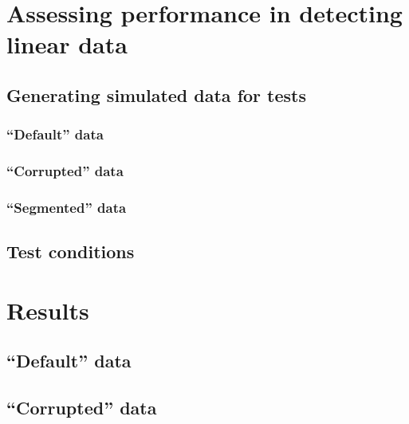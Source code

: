 \documentclass[
  oneside, 11pt, a4paper]{memoir}
\begin{document}
\hypertarget{assessing-performance-in-detecting-linear-data}{%
\section{Assessing performance in detecting linear data}\label{assessing-performance-in-detecting-linear-data}}

\hypertarget{generating-simulated-data-for-tests}{%
\subsection{Generating simulated data for tests}\label{generating-simulated-data-for-tests}}

\hypertarget{default-data}{%
\subsubsection{\texorpdfstring{\enquote{Default} data}{``Default'' data}}\label{default-data}}

\hypertarget{corrupted-data}{%
\subsubsection{\texorpdfstring{\enquote{Corrupted} data}{``Corrupted'' data}}\label{corrupted-data}}

\hypertarget{segmented-data}{%
\subsubsection{\texorpdfstring{\enquote{Segmented} data}{``Segmented'' data}}\label{segmented-data}}

\hypertarget{test-conditions}{%
\subsection{Test conditions}\label{test-conditions}}

\hypertarget{results-3}{%
\section{Results}\label{results-3}}

\hypertarget{default-data-1}{%
\subsection{\texorpdfstring{\enquote{Default} data}{``Default'' data}}\label{default-data-1}}

\hypertarget{corrupted-data-1}{%
\subsection{\texorpdfstring{\enquote{Corrupted} data}{``Corrupted'' data}}\label{corrupted-data-1}}
\end{document}

